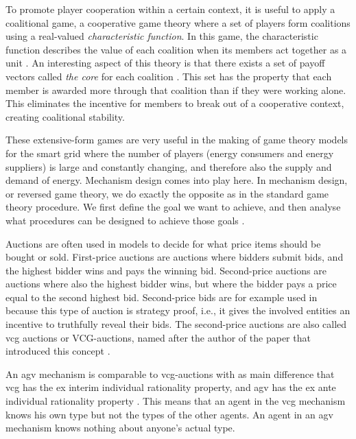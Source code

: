 To promote player cooperation within a certain context, it is useful to apply a coalitional game, a cooperative game theory where a set of players form coalitions using a real-valued \emph{characteristic function}. In this game, the characteristic function describes the value of each coalition when its members act together as a unit \cite{Ferguson2014}. An interesting aspect of this theory is that there exists a set of payoff vectors called \emph{the core} for each coalition \cite{Myerson1991}. This set has the property that each member is awarded more through that coalition than if they were working alone. This eliminates the incentive for members to break out of a cooperative context, creating coalitional stability. 


These extensive-form games are very useful in the making of game theory models for the smart grid where the number of players (energy consumers and energy suppliers) is large and constantly changing, and therefore also the supply and demand of energy. Mechanism design comes into play here. In mechanism design, or reversed game theory, we do exactly the opposite as in the standard game theory procedure. We first define the goal we want to achieve, and then analyse what procedures can be designed to achieve those goals \cite{SalfatiRabinovici2014}. 

Auctions are often used in models to decide for what price items should be bought or sold. First-price auctions are auctions where bidders submit bids, and the highest bidder wins and pays the winning bid. Second-price auctions are auctions where also the highest bidder wins, but where the bidder pays a price equal to the second highest bid. Second-price bids are for example used in \cite{SaadHanPoorEtAl2011} because this type of auction is strategy proof, i.e., it gives the involved entities an incentive to truthfully reveal their bids. The second-price auctions are also called \ac{vcg} auctions or VCG-auctions, named after the author of the paper that introduced this concept \cite{Vickrey1961}.

An \ac{agv} mechanism is comparable to \ac{vcg}-auctions with as main difference that \ac{vcg} has the ex interim individual rationality property, and \ac{agv} has the ex ante individual rationality property \cite{ShohamLeyton-Brown2008}. This means that an agent in the \ac{vcg} mechanism knows his own type but not the types of the other agents. An agent in an \ac{agv} mechanism knows nothing about anyone’s actual type.  

